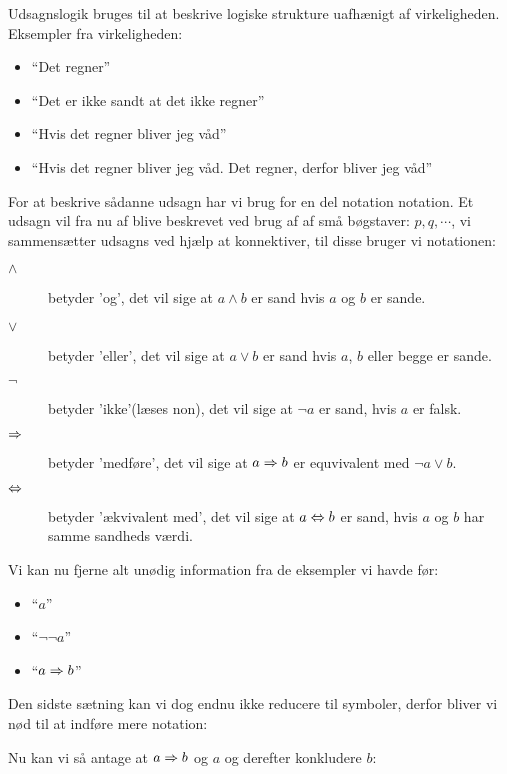 Udsagnslogik bruges til at beskrive logiske strukture uafhænigt af virkeligheden.
Eksempler fra virkeligheden:
\begin{itemize}
    \item ``Det regner''
    \item ``Det er ikke sandt at det ikke regner''
    \item ``Hvis det regner bliver jeg våd''
    \item ``Hvis det regner bliver jeg våd. Det regner, derfor bliver jeg våd''
\end{itemize}

For at beskrive sådanne udsagn har vi brug for en del notation notation. Et udsagn vil fra nu af blive beskrevet ved brug af af små bøgstaver: $p, q, \cdots$,
vi sammensætter udsagns ved hjælp at konnektiver, til disse bruger vi notationen:

\begin{description}
    \item[$\land$] betyder 'og', det vil sige at $a \land b$ er sand hvis $a$ og $b$ er sande.
    \item[$\lor$] betyder 'eller', det vil sige at $a \lor b$ er sand hvis $a$, $b$ eller begge er sande.
    \item[$\lnot$] betyder 'ikke'(læses non), det vil sige at $\lnot a$ er sand, hvis $a$ er falsk.
    \item[$\imp$] betyder 'medføre', det vil sige at $a \imp b$ er equvivalent med $\lnot a \lor b$.
    \item[$\bimp$] betyder 'ækvivalent med', det vil sige at $a \bimp b$ er sand, hvis $a$ og $b$ har samme sandheds værdi.
\end{description}

Vi kan nu fjerne alt unødig information fra de eksempler vi havde før:
\begin{itemize}
    \item ``$a$''
    \item ``$\lnot \lnot a$''
    \item ``$a \imp b$''
\end{itemize}

Den sidste sætning kan vi dog endnu ikke reducere til symboler, derfor bliver vi nød til at indføre mere notation:

\begin{prooftree}
\end{prooftree}

Nu kan vi så antage at $a \imp b$ og $a$ og derefter konkludere $b$:
\begin{prooftree}
\end{prooftree}

